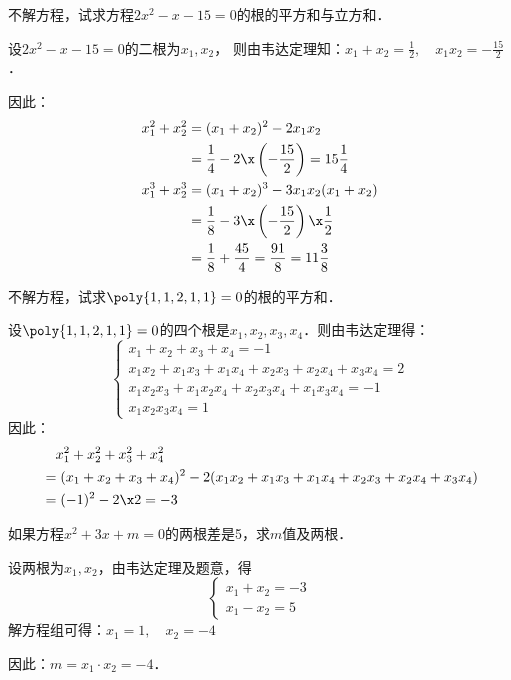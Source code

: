 \begin{example}
    不解方程，试求方程$2x^2-x-15=0$的根的平方和与立方和．
\end{example}


\begin{solution}
    设$2x^2-x-15=0$的二根为$x_1,x_2$，
    则由韦达定理知：$x_1+x_2=\frac{1}{2},\quad x_1x_2=-\frac{15}{2}$．

    因此：
\[\begin{split}
   x^2_1+x^2_2&=(x_1+x_2)^2-2x_1x_2\\ 
    &=\frac{1}{4}-2\x\left(-\frac{15}{2}\right)
    =15\frac{1}{4}\\
x^3_1+x^3_2&=(x_1+x_2)^3-3x_1x_2(x_1+x_2)\\
&=\frac{1}{8}-3\x\left(-\frac{15}{2}\right)\x\frac{1}{2}\\
&=\frac{1}{8}+\frac{45}{4}=\frac{91}{8}=11\frac{3}{8}    
\end{split}\]

\end{solution}


\begin{example}
不解方程，试求$\poly{1,1,2,1,1}=0$的根的平方和．
\end{example}

\begin{solution}
 设$\poly{1,1,2,1,1}=0$的四个根是$x_1,x_2,x_3,x_4$．则由韦达定理得：
\[\begin{cases}
  x_1+x_2+x_3+x_4=-1\\
  x_1x_2+x_1x_3+x_1x_4+x_2x_3+x_2x_4+x_3x_4=2\\
  x_1x_2x_3+x_1x_2x_4+x_2x_3x_4+x_1x_3x_4=-1\\
  x_1x_2x_3x_4=1  
\end{cases}\]
因此：
\[\begin{split}
  &\quad  x^2_1+x_2^2+x_3^2+x_4^2\\
&=(x_1+x_2+x_3+x_4)^2-2(x_1x_2+x_1x_3+x_1x_4+x_2x_3+x_2x_4+x_3x_4)\\
&=(-1)^2-2\x 2=-3
\end{split}\]
\end{solution}

\begin{example}
如果方程$x^2+3x+m=0$的两根差是5，求$m$值及两根．
\end{example}

\begin{solution}
    设两根为$x_1,x_2$，由韦达定理及题意，得
\[\begin{cases}
    x_1+x_2=-3\\
    x_1-x_2=5
\end{cases}\]
解方程组可得：$x_1=1,\quad x_2=-4$

因此：$m=x_1\cdot x_2=-4$．
\end{solution}

